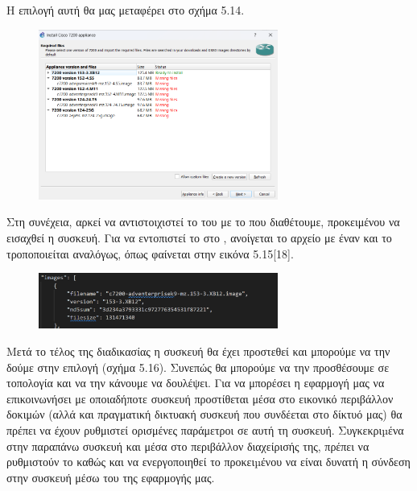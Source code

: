 \FloatBarrier

\noindent Η επιλογή αυτή θα μας μεταφέρει στο σχήμα 5.14.

\begin{figure}[htb]
	\centering
	\includegraphics[width=0.7\textwidth]{graphics/appliances.png}
	\caption{ }
\end{figure}

\FloatBarrier

\noindent Στη συνέχεια, αρκεί να αντιστοιχιστεί το  του  με το  που διαθέτουμε, προκειμένου να εισαχθεί η συσκευή. Για να εντοπιστεί το  στο , ανοίγεται το αρχείο με έναν  και το  τροποποιείται αναλόγως, όπως φαίνεται στην εικόνα 5.15[18].

\FloatBarrier

\begin{figure}[htb]
	\centering
	\includegraphics[width=0.7\textwidth]{graphics/appliance_filename.png}
	\caption{ }
\end{figure}

\FloatBarrier

Μετά το τέλος της διαδικασίας η συσκευή θα έχει προστεθεί και μπορούμε να την δούμε στην επιλογή  (σχήμα 5.16).
Συνεπώς θα μπορούμε να την προσθέσουμε σε τοπολογία και να την κάνουμε να δουλέψει. Για να μπορέσει η εφαρμογή μας να επικοινωνήσει με οποιαδήποτε συσκευή προστίθεται μέσα στο εικονικό περιβάλλον δοκιμών (αλλά και πραγματική δικτυακή συσκευή που συνδέεται στο δίκτυό μας) θα πρέπει να έχουν ρυθμιστεί ορισμένες παράμετροι σε αυτή τη συσκευή. Συγκεκριµένα στην παραπάνω συσκευή  και μέσα στο περιβάλλον διαχείρισής της, πρέπει να ρυθμιστούν το  καθώς και να ενεργοποιηθεί το  προκειµένου να είναι δυνατή η σύνδεση στην συσκευή μέσω του  της εφαρμογής μας.

